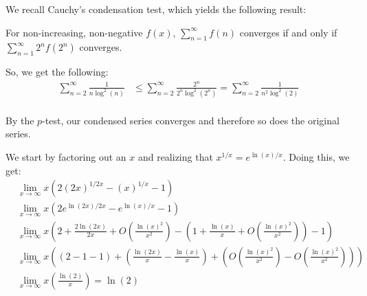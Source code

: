 \documentclass{report}
\begin{document}
\sol We recall Cauchy's condensation test, which yields the following result:

For non-increasing, non-negative $f(x)$, $\sum_{n=1}^{\infty} f(n)$ converges if and only if $\sum_{n=1}^{\infty} 2^nf(2^n)$ converges.

So, we get the following:
\begin{align*}
    \sum_{n=2}^{\infty}\frac{1}{n\log^2(n)} &\leq \sum_{n=2}^{\infty} \frac{2^n}{2^n\log^2(2^n)} = \sum_{n=2}^{\infty} \frac{1}{n^2\log^2(2)}\\
\end{align*}

By the $p$-test, our condensed series converges and therefore so does the original series.


\sol We start by factoring out an $x$ and realizing that $x^{1/x} = e^{\ln(x)/x}$. Doing this, we get:
\begin{align*}
    &\lim_{x \to \infty} x (2(2x)^{1/2x} - (x)^{1/x} - 1) \\
    &\lim_{x \to \infty} x(2e^{\ln(2x)/2x} - e^{\ln(x)/x} - 1) \\
    &\lim_{x \to \infty} x \left(2 + \frac{2\ln(2x)}{2x} + O\left(\frac{\ln(x)^2}{x^2}\right) - \left(1 + \frac{\ln(x)}{x} + O\left(\frac{\ln(x)^2}{x^2}\right)\right) - 1\right) \\
    &\lim_{x \to \infty} x \left((2 - 1 - 1) + \left(\frac{\ln(2x)}{x} - \frac{\ln(x)}{x}\right) + \left(O\left(\frac{\ln(x)^2}{x^2}\right) - O\left(\frac{\ln(x)^2}{x^2}\right)\right)\right) \\
    &\lim_{x \to \infty} x\left(\frac{\ln(2)}{x}\right) = \ln(2)
\end{align*}
\end{document}
